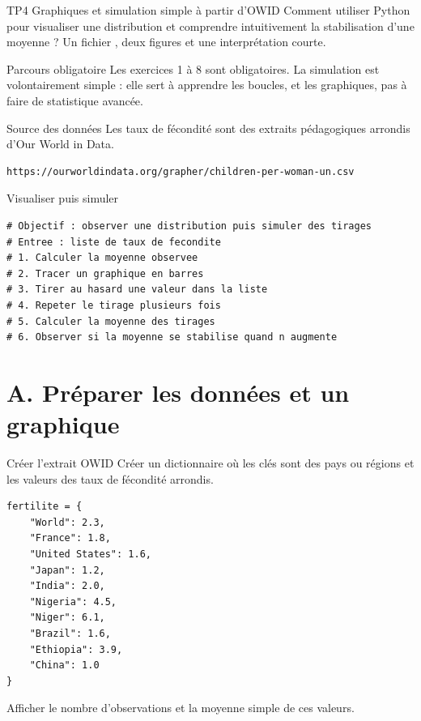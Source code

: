 \documentclass[11pt,a4paper]{article}
\begin{document}
\workbooktitle
  {TP4}
  {Graphiques et simulation simple à partir d'OWID}
  {Comment utiliser Python pour visualiser une distribution et comprendre intuitivement la stabilisation d'une moyenne ?}
  {Un fichier , deux figures  et une interprétation courte.}

\begin{checkpointbox}{Parcours obligatoire}
Les exercices 1 à 8 sont obligatoires. La simulation est volontairement simple : elle sert à apprendre les boucles,  et les graphiques, pas à faire de statistique avancée.
\end{checkpointbox}

\begin{checkpointbox}{Source des données}
Les taux de fécondité sont des extraits pédagogiques arrondis d'Our World in Data.
\begin{lstlisting}[language=terminal]
https://ourworldindata.org/grapher/children-per-woman-un.csv
\end{lstlisting}
\end{checkpointbox}

\begin{pseudocodeexercise}{Visualiser puis simuler}
\begin{lstlisting}
# Objectif : observer une distribution puis simuler des tirages
# Entree : liste de taux de fecondite
# 1. Calculer la moyenne observee
# 2. Tracer un graphique en barres
# 3. Tirer au hasard une valeur dans la liste
# 4. Repeter le tirage plusieurs fois
# 5. Calculer la moyenne des tirages
# 6. Observer si la moyenne se stabilise quand n augmente
\end{lstlisting}
\end{pseudocodeexercise}

\section*{A. Préparer les données et un graphique}

\begin{mandatoryexercise}{Créer l'extrait OWID}
Créer un dictionnaire où les clés sont des pays ou régions et les valeurs des taux de fécondité arrondis.
\begin{lstlisting}
fertilite = {
    "World": 2.3,
    "France": 1.8,
    "United States": 1.6,
    "Japan": 1.2,
    "India": 2.0,
    "Nigeria": 4.5,
    "Niger": 6.1,
    "Brazil": 1.6,
    "Ethiopia": 3.9,
    "China": 1.0
}
\end{lstlisting}
Afficher le nombre d'observations et la moyenne simple de ces valeurs.
\end{mandatoryexercise}
\end{document}
